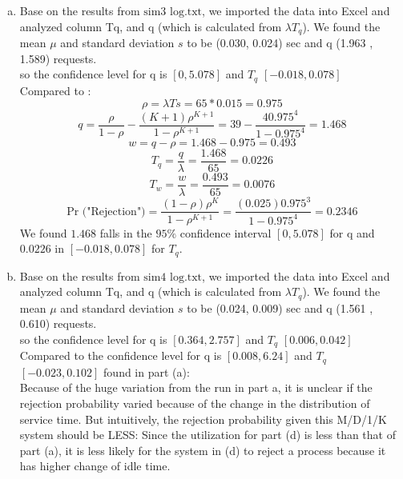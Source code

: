 \documentclass{article}   	                         %
\begin{document}
\begin{enumerate}[(a)]
\item
Base on the results from $\text {sim3 log.txt}$, we imported the data into Excel and analyzed column Tq, and q (which is calculated from $\lambda T_q$). We found the mean $\mu$ and standard deviation $s$ to be (0.030, 0.024) sec and q (1.963 , 1.589) requests.\\
so the confidence level for q is $[0, 5.078]$ and $T_q$ $[-0.018, 0.078]$\\
Compared to :\\
$$\rho = \lambda Ts = 65*0.015 = 0.975$$
$$q = \frac{\rho}{1-\rho} - \frac{(K+1)\rho^{K+1}}{1-\rho^{K+1}} = 39 - \frac{4 0.975^4}{1-0.975^4} = 1.468$$
$$w = q-\rho = 1.468 - 0.975 = 0.493 $$
$$T_q = \frac{q}{\lambda} = \frac{1.468}{65} = 0.0226$$
$$T_w = \frac{w}{\lambda} = \frac{0.493}{65} = 0.0076$$
$$\text {Pr ("Rejection")} = \frac{(1-\rho)\rho^K}{1-\rho^{K+1}} = \frac{(0.025)0.975^3}{1-0.975^4} = 0.2346 $$
We found $1.468$ falls in the $95\%$ confidence interval $[0, 5.078]$ for q and $ 0.0226$ in $[-0.018, 0.078]$ for $T_q$.\\

\item
Base on the results from $\text {sim4 log.txt}$, we imported the data into Excel and analyzed column Tq, and q (which is calculated from $\lambda T_q$). We found the mean $\mu$ and standard deviation $s$ to be (0.024, 0.009) sec and q (1.561 , 0.610) requests.\\
so the confidence level for q is $[0.364, 2.757]$ and $T_q$ $[0.006, 0.042]$\\
Compared to the confidence level for q is $[0.008, 6.24]$ and $T_q$ $[-0.023, 0.102]$ found in part (a):\\
Because of the huge variation from the run in part a, it is unclear if the rejection probability varied because of the change in the distribution of service time. But intuitively, the rejection probability given this M/D/1/K system should be LESS: Since the utilization for part (d) is less than that of part (a), it is less likely for the system in (d) to reject a process because it has higher change of idle time.


\end{enumerate}
\end{document}
